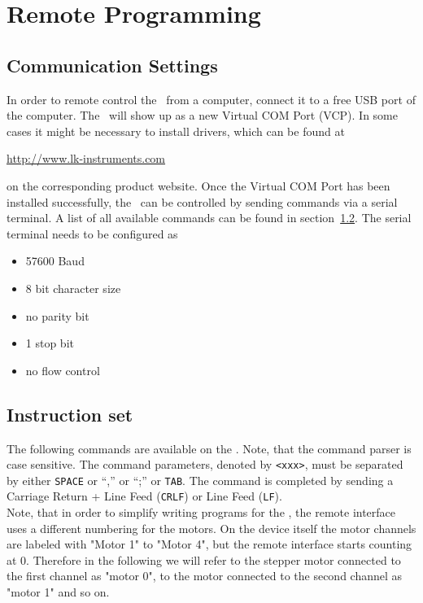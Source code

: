 
\section{Remote Programming}
\label{chp:remote_programming}
\subsection{Communication Settings}
In order to remote control the \productName ~from a computer, connect it to a free USB port of the computer. The \productName ~will show up as a new Virtual COM Port (VCP). In some cases it might be necessary to install drivers, which can be found at
\begin{center}
  \url{http://www.lk-instruments.com}
\end{center}
on the corresponding product website.
Once the Virtual COM Port has been installed successfully, the \productName ~can be controlled by sending commands via a serial terminal. A list of all available commands can be found in section~\ref{section_instruction_set}. The serial terminal needs to be configured as
\begin{itemize}
\item 57600 Baud
\item 8 bit character size
\item no parity bit
\item 1 stop bit
\item no flow control
\end{itemize}

\subsection{Instruction set}
\label{section_instruction_set}
The following commands are available on the \productName .
Note, that the command parser is case sensitive. The command
parameters, denoted by \texttt{<xxx>}, must be separated by
either \texttt{SPACE} or ``,'' or ``;'' or \texttt{TAB}. The
command is completed by sending a  Carriage Return + Line Feed
(\texttt{CRLF}) or Line Feed (\texttt{LF}).\\
Note, that in order to simplify writing programs for the \productName , the remote interface uses a different numbering for the motors. On the device itself the motor channels are labeled with "Motor 1" to "Motor 4", but the remote interface starts counting at 0. Therefore in the following we will refer to the stepper motor connected to the first channel as "motor 0", to the motor connected to the second channel as "motor 1" and so on.

